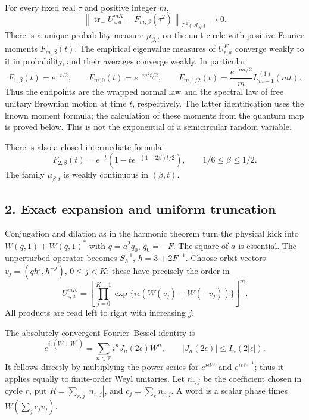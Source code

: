 \begin{theorem}\label{pass1:pell_harmonic_returns-1} For every fixed real \(\tau\) and positive integer \(m\),
\[
 \left\|\operatorname{tr}_- U_{\epsilon,a}^{mK}
                 -F_{m,\beta}(\tau^2)\right\|_{L^2(\mathcal A_K)}
       \longrightarrow0.                                    \tag{R3}
\]
There is a unique probability measure \(\mu_{\beta,t}\) on the unit circle
with positive Fourier moments \(F_{m,\beta}(t)\). The empirical eigenvalue
measures of \(U_{\epsilon,a}^K\) converge weakly to it in probability, and
their averages converge weakly. In particular
\[
 F_{1,\beta}(t)=e^{-t/2},\qquad
 F_{m,0}(t)=e^{-m^2t/2},\qquad
 F_{m,1/2}(t)=\frac{e^{-mt/2}}m L_{m-1}^{(1)}(mt).              \tag{R4}
\]
Thus the endpoints are the wrapped normal law and the spectral law of free
unitary Brownian motion at time \(t\), respectively. The latter identification
uses the known moment formula; the calculation of these moments from the
quantum map is proved below. This is not the exponential of a semicircular
random variable.
\end{theorem}

There is also a closed intermediate formula:
\[
 F_{2,\beta}(t)=e^{-t}\left(1-t e^{-(1-2\beta)t/2}\right),
                      \qquad 1/6\le\beta\le1/2.               \tag{R5}
\]
The family \(\mu_{\beta,t}\) is weakly continuous in \((\beta,t)\).

\hypertarget{harmonic-returns-exact-expansion-and-uniform-truncation}{%
\subsection{2. Exact expansion and uniform truncation}\label{harmonic-returns-exact-expansion-and-uniform-truncation}}

Conjugation and dilation as in the harmonic theorem turn the physical kick
into \(W(q,1)+W(q,1)^*\) with \(q=a^2q_0\), \(q_0=-F\). The square of \(a\) is
essential. The unperturbed operator becomes \(S_h^{-1}\), \(h=3+2F^{-1}\).
Choose orbit vectors \(v_j=(qh^j,h^{-j})\), \(0\le j<K\); these have precisely
the order in
\[
 U_{\epsilon,a}^{mK}
   =\left[\prod_{j=0}^{K-1}
      \exp\{i\epsilon(W(v_j)+W(-v_j))\}\right]^m.               \tag{R6}
\]
All products are read left to right with increasing \(j\).

The absolutely convergent Fourier--Bessel identity is
\[
 e^{i\epsilon(W+W^*)}=\sum_{n\in\mathbb Z}i^nJ_n(2\epsilon)W^n,
 \qquad |J_n(2\epsilon)|\le I_n(2|\epsilon|).                   \tag{R7}
\]
It follows directly by multiplying the power series for
\(e^{i\epsilon W}\) and \(e^{i\epsilon W^{-1}}\); thus it applies equally to
finite-order Weyl unitaries. Let \(n_{r,j}\) be the coefficient chosen in
cycle \(r\), put \(R=\sum_{r,j}|n_{r,j}|\), and
\(c_j=\sum_r n_{r,j}\). A word is a scalar phase times
\(W(\sum_j c_jv_j)\).


